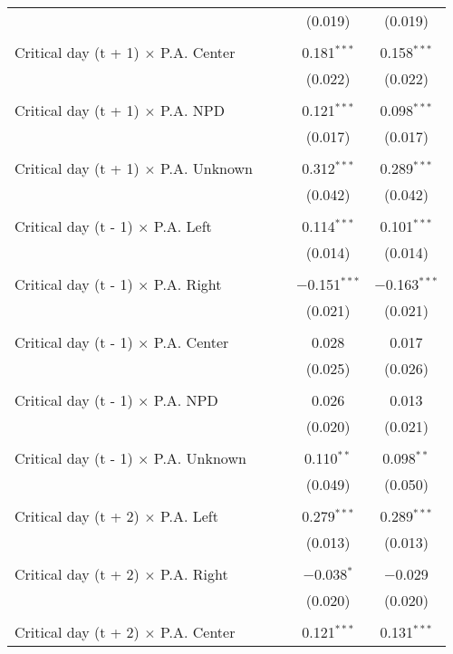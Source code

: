 \documentclass[
]{article}
\begin{document}
\begin{table}[!htbp]
{\begin{tabular}{@{\extracolsep{5pt}}lcccc}
  &  &  & (0.019) & (0.019) \\ 
  & & & & \\ 
 Critical day (t + 1) $\times$ P.A. Center &  &  & 0.181$^{***}$ & 0.158$^{***}$ \\ 
  &  &  & (0.022) & (0.022) \\ 
  & & & & \\ 
 Critical day (t + 1) $\times$ P.A. NPD &  &  & 0.121$^{***}$ & 0.098$^{***}$ \\ 
  &  &  & (0.017) & (0.017) \\ 
  & & & & \\ 
 Critical day (t + 1) $\times$ P.A. Unknown &  &  & 0.312$^{***}$ & 0.289$^{***}$ \\ 
  &  &  & (0.042) & (0.042) \\ 
  & & & & \\ 
 Critical day (t - 1) $\times$ P.A. Left &  &  & 0.114$^{***}$ & 0.101$^{***}$ \\ 
  &  &  & (0.014) & (0.014) \\ 
  & & & & \\ 
 Critical day (t - 1) $\times$ P.A. Right &  &  & $-$0.151$^{***}$ & $-$0.163$^{***}$ \\ 
  &  &  & (0.021) & (0.021) \\ 
  & & & & \\ 
 Critical day (t - 1) $\times$ P.A. Center &  &  & 0.028 & 0.017 \\ 
  &  &  & (0.025) & (0.026) \\ 
  & & & & \\ 
 Critical day (t - 1) $\times$ P.A. NPD &  &  & 0.026 & 0.013 \\ 
  &  &  & (0.020) & (0.021) \\ 
  & & & & \\ 
 Critical day (t - 1) $\times$ P.A. Unknown &  &  & 0.110$^{**}$ & 0.098$^{**}$ \\ 
  &  &  & (0.049) & (0.050) \\ 
  & & & & \\ 
 Critical day (t + 2) $\times$ P.A. Left &  &  & 0.279$^{***}$ & 0.289$^{***}$ \\ 
  &  &  & (0.013) & (0.013) \\ 
  & & & & \\ 
 Critical day (t + 2) $\times$ P.A. Right &  &  & $-$0.038$^{*}$ & $-$0.029 \\ 
  &  &  & (0.020) & (0.020) \\ 
  & & & & \\ 
 Critical day (t + 2) $\times$ P.A. Center &  &  & 0.121$^{***}$ & 0.131$^{***}$ \\ 

\end{tabular}}
\end{table}
\end{document}
